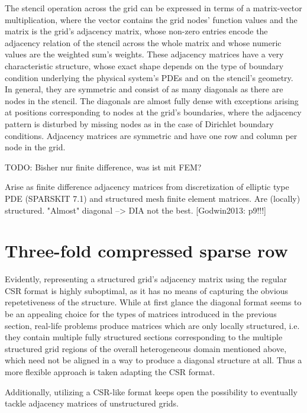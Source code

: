 \documentclass{article}
\begin{document}
    The stencil operation across the grid can be expressed in terms of a matrix-vector multiplication, where
    the vector contains the grid nodes' function values and the matrix is the grid's adjacency matrix, whose non-zero
    entries encode the adjacency relation of the stencil across the whole matrix and whose numeric values are the
    weighted sum's weights. These adjacency matrices have a very characteristic structure, whose exact shape depends on
    the type of boundary condition underlying the physical system's PDEs and on the stencil's geometry. In general, they
    are symmetric and consist of as many diagonals as there are nodes in the stencil. The diagonals are almost fully
    dense with exceptions arising at positions corresponding to nodes at the grid's boundaries, where the
    adjacency pattern is disturbed by missing nodes as in the case of Dirichlet boundary conditions. Adjacency matrices
    are symmetric and have one row and column per node in the grid.

    

    TODO: Bisher nur finite difference, was ist mit FEM?

    Arise as finite difference adjacency matrices from discretization of elliptic type PDE (SPARSKIT 7.1)
      and structured mesh finite element matrices.
    Are (locally) structured.
    "Almost" diagonal --> DIA not the best. [Godwin2013: p9!!!]

\section{Three-fold compressed sparse row}

  Evidently, representing a structured grid's adjacency matrix using the regular CSR format is highly suboptimal, as it
  has no means of capturing the obvious repetetiveness of the structure. While at first glance the diagonal format seems
  to be an appealing choice for the types of matrices introduced in the previous section, real-life problems produce
  matrices which are only locally structured, i.e. they contain multiple fully structured sections corresponding to the
  multiple structured grid regions of the overall heterogeneous domain mentioned above, which need not be aligned in
  a way to produce a diagonal structure at all. Thus a more flexible approach is taken adapting the CSR format.

  Additionally, utilizing a CSR-like format keeps open the possibility to eventually tackle adjacency matrices of
  unstructured grids.
\end{document}
